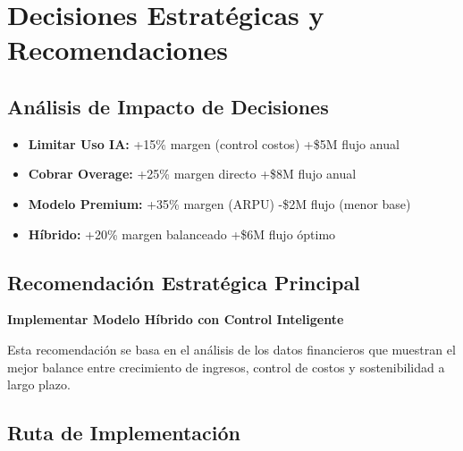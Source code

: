 \documentclass[12pt]{article}
\begin{document}
\section{Decisiones Estratégicas y Recomendaciones}

\subsection{Análisis de Impacto de Decisiones}

\begin{itemize}
    \item \textbf{Limitar Uso IA:} +15\% margen (control costos) +\$5M flujo anual
    \item \textbf{Cobrar Overage:} +25\% margen directo +\$8M flujo anual
    \item \textbf{Modelo Premium:} +35\% margen (ARPU) -\$2M flujo (menor base)
    \item \textbf{Híbrido:} +20\% margen balanceado +\$6M flujo óptimo
\end{itemize}

\subsection{Recomendación Estratégica Principal}

\textbf{Implementar Modelo Híbrido con Control Inteligente}

Esta recomendación se basa en el análisis de los datos financieros que muestran el mejor balance entre crecimiento de ingresos, control de costos y sostenibilidad a largo plazo.

\subsection{Ruta de Implementación}
\end{document}
